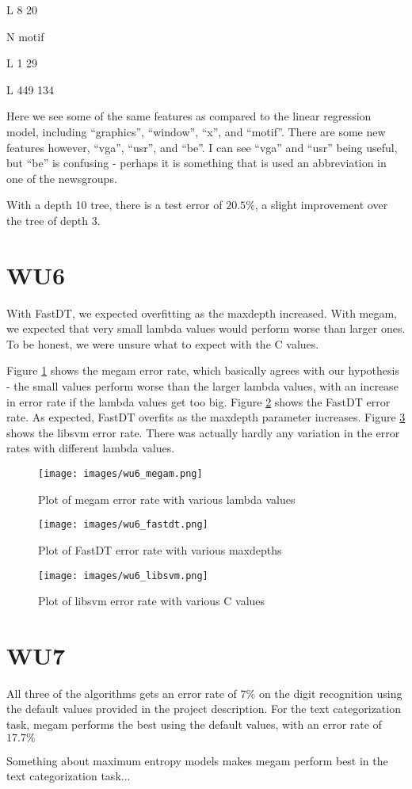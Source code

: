 L 8 20

N motif

L 1 29

L 449 134

Here we see some of the same features as compared to the linear regression model, including ``graphics'', ``window'', ``x'', and ``motif''. There are some new features however, ``vga'', ``usr'', and ``be''. I can see ``vga'' and ``usr'' being useful, but ``be'' is confusing - perhaps it is something that is used an abbreviation in one of the newsgroups.

With a depth 10 tree, there is a test error of $20.5\%$, a slight improvement over the tree of depth 3.

\section{WU6}
    With FastDT, we expected overfitting as the maxdepth increased. With megam, we expected that very small lambda values would perform worse than larger ones. To be honest, we were unsure what to expect with the C values. 

    Figure \ref{fig:megam} shows the megam error rate, which basically agrees with our hypothesis - the small values perform worse than the larger lambda values, with an increase in error rate if the lambda values get too big. Figure \ref{fig:fastdt} shows the FastDT error rate. As expected, FastDT overfits as the maxdepth parameter increases. Figure \ref{fig:libsvm} shows the libsvm error rate. There was actually hardly any variation in the error rates with different lambda values.

    \begin{figure}
	    \caption{Plot of megam error rate with various lambda values}
	    \label{fig:megam}
	    \texttt{[image: images/wu6\_megam.png]}
    \end{figure}

    \begin{figure}
	    \caption{Plot of FastDT error rate with various maxdepths}
	    \label{fig:fastdt}
	    \texttt{[image: images/wu6\_fastdt.png]}
    \end{figure}

    \begin{figure}
	    \caption{Plot of libsvm error rate with various C values}
	    \label{fig:libsvm}
	    \texttt{[image: images/wu6\_libsvm.png]}
    \end{figure}


\section{WU7}
All three of the algorithms gets an error rate of $7\%$ on the digit recognition using the default values provided in the project description. For the text categorization task, megam performs the best using the default values, with an error rate of $17.7\%$

Something about maximum entropy models makes megam perform best in the text categorization task...


